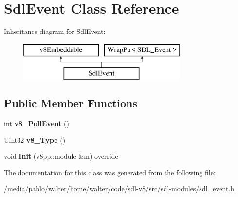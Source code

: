 \hypertarget{classSdlEvent}{}\section{Sdl\+Event Class Reference}
\label{classSdlEvent}
Inheritance diagram for Sdl\+Event\+:\begin{figure}[H]
\begin{center}
\leavevmode
\includegraphics[height=2.000000cm]{classSdlEvent}
\end{center}
\end{figure}
\subsection*{Public Member Functions}
\begin{DoxyCompactItemize}
\item 
\mbox{\label{classSdlEvent_a66c1886f2376a5eda87496587266fa99}} 
int {\bfseries v8\+\_\+\+Poll\+Event} ()
\item 
\mbox{\label{classSdlEvent_a83c194083fc24103e48cd0a60dcd9081}} 
Uint32 {\bfseries v8\+\_\+\+Type} ()
\item 
\mbox{\label{classSdlEvent_ad2ccda0f811dcadad5106ffd3499b5c3}} 
void {\bfseries Init} (v8pp\+::module \&m) override
\end{DoxyCompactItemize}


The documentation for this class was generated from the following file\+:\begin{DoxyCompactItemize}
\item 
/media/pablo/walter/home/walter/code/sdl-\/v8/src/sdl-\/modules/sdl\+\_\+event.\+h\end{DoxyCompactItemize}
